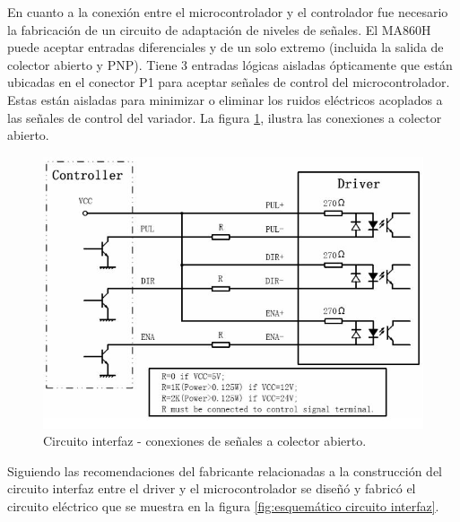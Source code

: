 En cuanto a la conexión entre el microcontrolador y el controlador fue necesario la fabricación de un circuito de adaptación de niveles de señales. El MA860H puede aceptar entradas diferenciales y de un solo extremo (incluida la salida de colector abierto y PNP). Tiene 3 entradas lógicas aisladas ópticamente que están ubicadas en el conector P1 para aceptar señales de control del microcontrolador. Estas están aisladas para minimizar o eliminar los ruidos eléctricos acoplados a las señales de control del variador. La figura \ref{fig:circuito interfaz}, ilustra las conexiones a colector abierto.

\begin{figure}[htpb]
\centering
\includegraphics[scale=.65]{./Figures/circuitointerfaz-driver.jpeg}
\caption{Circuito interfaz - conexiones de señales a colector abierto.}
\label{fig:circuito interfaz}
\end{figure}

Siguiendo las recomendaciones del fabricante relacionadas a la construcción del circuito interfaz entre el driver y el microcontrolador se diseñó y fabricó el circuito eléctrico que se muestra en la figura \ref{fig:esquemático circuito interfaz}.

